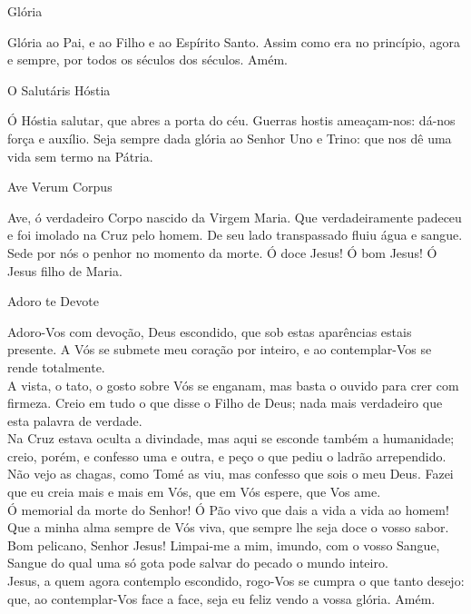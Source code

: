 \begin{center}
    Glória
\end{center}
\begin{flushleft}
    Glória ao Pai, e ao Filho e ao Espírito Santo. Assim como era no princípio, agora e sempre, por todos os séculos dos séculos. Amém.
\end{flushleft}
\begin{center}
    O Salutáris Hóstia
\end{center}
\begin{flushleft}
    Ó Hóstia salutar, que abres a porta do céu. Guerras hostis ameaçam-nos: dá-nos força e auxílio. Seja sempre dada glória ao Senhor Uno e Trino: que nos dê uma vida sem termo na Pátria.
\end{flushleft}
\begin{center}
    Ave Verum Corpus
\end{center}
\begin{flushleft}
    Ave, ó verdadeiro Corpo nascido da Virgem Maria. Que verdadeiramente padeceu e foi imolado na Cruz pelo homem. De seu lado transpassado fluiu água e sangue. Sede por nós o penhor no momento da morte. Ó doce Jesus! Ó bom Jesus! Ó Jesus filho de Maria.
\end{flushleft}
\begin{center}
    Adoro te Devote
\end{center}
\begin{flushleft}
    Adoro-Vos com devoção, Deus escondido, que sob estas aparências estais presente. A Vós se submete meu coração por inteiro, e ao contemplar-Vos se rende totalmente.
    \vspace{.2cm} \\
    A vista, o tato, o gosto sobre Vós se enganam, mas basta o ouvido para crer com firmeza. Creio em tudo o que disse o Filho de Deus; nada mais verdadeiro que esta palavra de verdade.
    \vspace{.2cm} \\
    Na Cruz estava oculta a divindade, mas aqui se esconde também a humanidade; creio, porém, e confesso uma e outra, e peço o que pediu o ladrão arrependido.
    \vspace{.2cm} \\
    Não vejo as chagas, como Tomé as viu, mas confesso que sois o meu Deus. Fazei que eu creia mais e mais em Vós, que em Vós espere, que Vos ame.
    \vspace{.2cm} \\
    Ó memorial da morte do Senhor! Ó Pão vivo que dais a vida a vida ao homem! Que a minha alma sempre de Vós viva, que sempre lhe seja doce o vosso sabor.
    \vspace{.2cm} \\
    Bom pelicano, Senhor Jesus! Limpai-me a mim, imundo, com o vosso Sangue, Sangue do qual uma só gota pode salvar do pecado o mundo inteiro.\
    \vspace{.2cm} \\
    Jesus, a quem agora contemplo escondido, rogo-Vos se cumpra o que tanto desejo: que, ao contemplar-Vos face a face, seja eu feliz vendo a vossa glória. Amém.
\end{flushleft}
